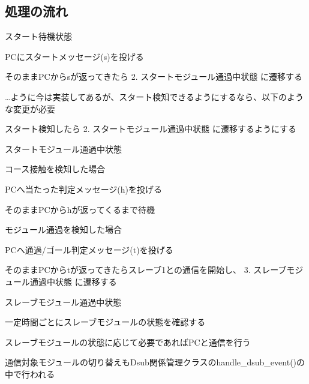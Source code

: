 \subsection*{処理の流れ}


\begin{DoxyEnumerate}
\item スタート待機状態
\end{DoxyEnumerate}
\begin{DoxyItemize}
\item P\+Cにスタートメッセージ(\textquotesingle{}s\textquotesingle{})を投げる
\item そのまま\+P\+Cから\textquotesingle{}s\textquotesingle{}が返ってきたら 2. スタートモジュール通過中状態 に遷移する
\item …ように今は実装してあるが、スタート検知できるようにするなら、以下のような変更が必要
\begin{DoxyItemize}
\item スタート検知したら 2. スタートモジュール通過中状態 に遷移するようにする
\end{DoxyItemize}
\end{DoxyItemize}
\begin{DoxyEnumerate}
\item スタートモジュール通過中状態
\end{DoxyEnumerate}
\begin{DoxyItemize}
\item コース接触を検知した場合
\begin{DoxyItemize}
\item P\+Cへ当たった判定メッセージ(\textquotesingle{}h\textquotesingle{})を投げる
\item そのまま\+P\+Cから\textquotesingle{}h\textquotesingle{}が返ってくるまで待機
\end{DoxyItemize}
\item モジュール通過を検知した場合
\begin{DoxyItemize}
\item P\+Cへ通過/ゴール判定メッセージ(\textquotesingle{}t\textquotesingle{})を投げる
\item そのまま\+P\+Cから\textquotesingle{}t\textquotesingle{}が返ってきたらスレーブ1との通信を開始し、 3. スレーブモジュール通過中状態 に遷移する
\end{DoxyItemize}
\end{DoxyItemize}
\begin{DoxyEnumerate}
\item スレーブモジュール通過中状態
\end{DoxyEnumerate}
\begin{DoxyItemize}
\item 一定時間ごとにスレーブモジュールの状態を確認する
\item スレーブモジュールの状態に応じて必要であれば\+P\+Cと通信を行う
\item 通信対象モジュールの切り替えも\+Dsub関係管理クラスの{\ttfamily handle\+\_\+dsub\+\_\+event()}の中で行われる
\end{DoxyItemize}

